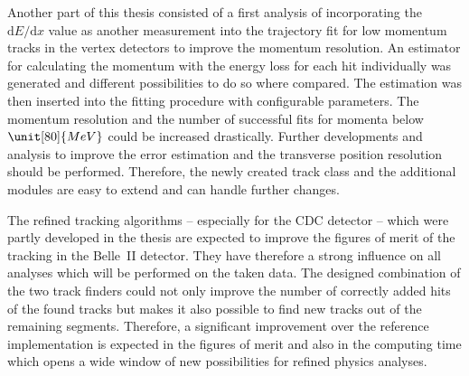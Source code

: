 Another part of this thesis consisted of a first analysis of incorporating the $\mathrm dE/\mathrm d x$ value as another measurement into the trajectory fit for low momentum tracks in the vertex detectors to improve the momentum resolution. An estimator for calculating the momentum with the energy loss for each hit individually was generated and different possibilities to do so where compared. The estimation was then inserted into the fitting procedure with configurable parameters. The momentum resolution and the number of successful fits for momenta below $\unit[80]{MeV}$ could be increased drastically. Further developments and analysis to improve the error estimation and the transverse position resolution should be performed. Therefore, the newly created track class and the additional modules are easy to extend and can handle further changes.


The refined tracking algorithms -- especially for the CDC detector -- which were partly developed in the thesis are expected to improve the figures of merit of the tracking in the Belle~II detector. They have therefore a strong influence on all analyses which will be performed on the taken data. The designed combination of the two track finders could not only improve the number of correctly added hits of the found tracks but makes it also possible to find new tracks out of the remaining segments. Therefore, a significant improvement over the reference implementation is expected in the figures of merit and also in the computing time which opens a wide window of new possibilities for refined physics analyses.